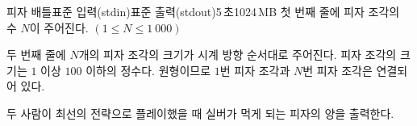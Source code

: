 \begin{problem}{피자 배틀}{표준 입력(stdin)}{표준 출력(stdout)}{5\,초}{1024\,MB}
\InputFile
첫 번째 줄에 피자 조각의 수 $N$이 주어진다. $(1 \leq N \leq 1\ 000)$

두 번째 줄에 $N$개의 피자 조각의 크기가 시계 방향 순서대로 주어진다. 피자 조각의 크기는 $1$ 이상 $100$ 이하의 정수다. 원형이므로 $1$번 피자 조각과 $N$번 피자 조각은 연결되어 있다.

\OutputFile
두 사람이 최선의 전략으로 플레이했을 때 실버가 먹게 되는 피자의 양을 출력한다.

\Examples

\begin{example}
%
%
\end{example}

\end{problem}

